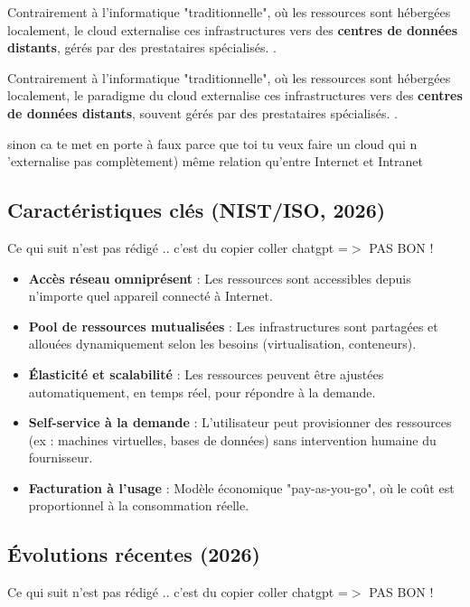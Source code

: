\documentclass{report} %
\begin{document}
Contrairement à l’informatique "traditionnelle", où les ressources
sont hébergées localement, le cloud externalise ces infrastructures
vers des \textbf{centres de données distants}, gérés par des
prestataires spécialisés.  \cite{ISO2026,NIST2026}.


{\color{red} Contrairement à l’informatique "traditionnelle", où les ressources
sont hébergées localement, le paradigme du cloud externalise ces infrastructures
vers des \textbf{centres de données distants}, souvent gérés par des
prestataires spécialisés.  \cite{ISO2026,NIST2026}.

\medskip
sinon ca te met en porte à faux parce que toi tu veux faire un cloud qui n 'externalise pas complètement)
 même relation qu'entre Internet et Intranet}



\subsection{Caractéristiques clés (NIST/ISO, 2026)}

{\color{red} Ce qui suit n'est pas rédigé .. c'est du copier coller chatgpt  =$>$ PAS BON !}

\begin{itemize}
\item \textbf{Accès réseau omniprésent} : Les ressources sont
  accessibles depuis n’importe quel appareil connecté à Internet.
\item \textbf{Pool de ressources mutualisées} : Les infrastructures
  sont partagées et allouées dynamiquement selon les besoins
  (virtualisation, conteneurs).
\item \textbf{Élasticité et scalabilité} : Les ressources peuvent être
  ajustées automatiquement, en temps réel, pour répondre à la demande.
\item \textbf{Self-service à la demande} : L’utilisateur peut
  provisionner des ressources (ex : machines virtuelles, bases de
  données) sans intervention humaine du fournisseur.
\item \textbf{Facturation à l’usage} : Modèle économique
  "pay-as-you-go", où le coût est proportionnel à la consommation
  réelle.
\end{itemize}

\subsection{Évolutions récentes (2026)}

{\color{red} Ce qui suit n'est pas rédigé .. c'est du copier coller chatgpt  =$>$ PAS BON !}
\end{document}
